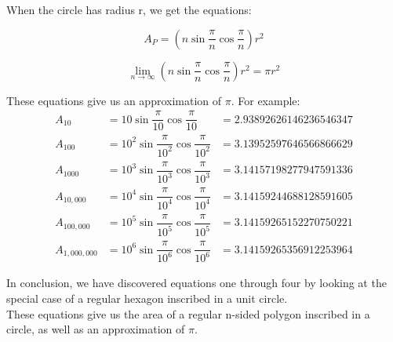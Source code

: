 \documentclass{article}
\begin{document}
When the circle has radius r, we get the equations:

\begin{equation}
A_{P} = \left( n \sin \dfrac{\pi}{n} \cos \dfrac{\pi}{n} \right) r^2
\end{equation}

\begin{equation}
\lim_{n \to \infty} \left( n \sin \dfrac{\pi}{n} \cos \dfrac{\pi}{n} \right) r^2 = \pi r^2
\end{equation}

These equations give us an approximation of $\pi$. For example:
\begin{align*}
A_{10} &= 10 \sin \dfrac{\pi}{10} \cos \dfrac{\pi}{10} &= 2.93892626146236546347 \\
A_{100} &= 10^2 \sin \dfrac{\pi}{10^2} \cos \dfrac{\pi}{10^2} &= 3.13952597646566866629 \\
A_{1000} &= 10^3 \sin \dfrac{\pi}{10^3} \cos \dfrac{\pi}{10^3} &= 3.14157198277947591336 \\
A_{10,000} &= 10^4 \sin \dfrac{\pi}{10^4} \cos \dfrac{\pi}{10^4} &= 3.14159244688128591605 \\
A_{100,000} &= 10^5 \sin \dfrac{\pi}{10^5} \cos \dfrac{\pi}{10^5} &= 3.14159265152270750221 \\
A_{1,000,000} &= 10^6 \sin \dfrac{\pi}{10^6} \cos \dfrac{\pi}{10^6} &= 3.14159265356912253964
\end{align*}

In conclusion, we have discovered equations one through four by looking at the special case of a regular hexagon inscribed in a unit circle. \\

These equations give us the area of a regular n-sided polygon inscribed in a circle, as well as an approximation of $\pi$.
\end{document}
